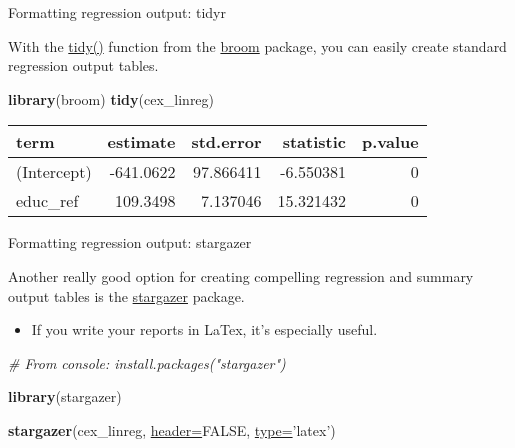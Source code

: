 \documentclass[ignorenonframetext,]{beamer}
\newenvironment{Shaded}{\begin{snugshade}}{\end{snugshade}}
\newcommand{\KeywordTok}[1]{\textcolor[rgb]{0.26,0.66,0.93}{\textbf{#1}}}
\newcommand{\DataTypeTok}[1]{\textcolor[rgb]{0.74,0.68,0.62}{\underline{#1}}}
\newcommand{\StringTok}[1]{\textcolor[rgb]{0.02,0.61,0.04}{#1}}
\newcommand{\CommentTok}[1]{\textcolor[rgb]{0.00,0.40,1.00}{\textit{#1}}}
\newcommand{\OtherTok}[1]{\textcolor[rgb]{0.74,0.68,0.62}{#1}}
\newcommand{\NormalTok}[1]{\textcolor[rgb]{0.74,0.68,0.62}{#1}}
\providecommand{\tightlist}{%
  \setlength{\itemsep}{0pt}\setlength{\parskip}{0pt}}
\begin{document}
\begin{frame}[fragile]{Formatting regression output: tidyr}

With the
\href{https://www.rdocumentation.org/packages/broom/versions/0.4.3/topics/tidy}{tidy()}
function from the
\href{https://www.rdocumentation.org/packages/broom}{broom} package, you
can easily create standard regression output tables.

\begin{Shaded}
\begin{Highlighting}[]
\KeywordTok{library}\NormalTok{(broom)}
\KeywordTok{tidy}\NormalTok{(cex_linreg)}
\end{Highlighting}
\end{Shaded}

\begin{longtable}[]{@{}lrrrr@{}}
\toprule
term & estimate & std.error & statistic & p.value\tabularnewline
\midrule
\endhead
(Intercept) & -641.0622 & 97.866411 & -6.550381 & 0\tabularnewline
educ\_ref & 109.3498 & 7.137046 & 15.321432 & 0\tabularnewline
\bottomrule
\end{longtable}

\end{frame}

\begin{frame}[fragile]{Formatting regression output: stargazer}

Another really good option for creating compelling regression and
summary output tables is the
\href{https://www.rdocumentation.org/packages/stargazer/}{stargazer}
package.

\begin{itemize}
\tightlist
\item
  If you write your reports in LaTex, it's especially useful.
\end{itemize}

\begin{Shaded}
\begin{Highlighting}[]
\CommentTok{# From console:  install.packages("stargazer")}

\KeywordTok{library}\NormalTok{(stargazer)}

\KeywordTok{stargazer}\NormalTok{(cex_linreg, }\DataTypeTok{header=}\OtherTok{FALSE}\NormalTok{, }\DataTypeTok{type=}\StringTok{'latex'}\NormalTok{)}
\end{Highlighting}
\end{Shaded}

\end{frame}
\end{document}
